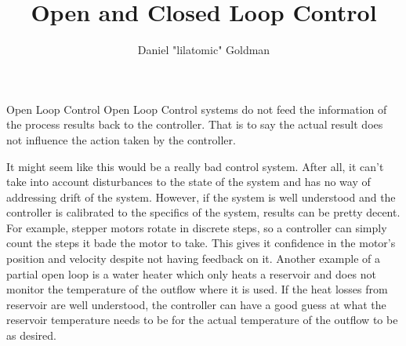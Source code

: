 \documentclass{../templates/topic}
\title{Open and Closed Loop Control}
\author{Daniel "lilatomic" Goldman}
\begin{document}
\begin{section}{Open Loop Control}
	Open Loop Control systems do not feed the information of the process results back to the controller. That is to say the actual result does not influence the action taken by the controller.
	
	It might seem like this would be a really bad control system. After all, it can't take into account disturbances to the state of the system and has no way of addressing drift of the system. However, if the system is well understood and the controller is calibrated to the specifics of the system, results can be pretty decent. For example, stepper motors rotate in discrete steps, so a controller can simply count the steps it bade the motor to take. This gives it confidence in the motor's position and velocity despite not having feedback on it. Another example of a partial open loop is a water heater which only heats a reservoir and does not monitor the temperature of the outflow where it is used. If the heat losses from reservoir are well understood, the controller can have a good guess at what the reservoir temperature needs to be for the actual temperature of the outflow to be as desired.
\end{section}
\end{document}
